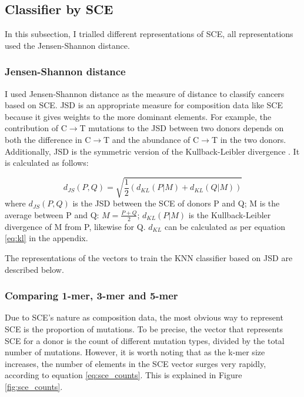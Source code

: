 \newpage
\subsection{Classifier by SCE}
In this subsection, I trialled different representations of SCE, all representations used the Jensen-Shannon distance. 

\subsubsection{Jensen-Shannon distance}
I used Jensen-Shannon distance \citep[JSD;][]{Osterreicher2003} as the measure of distance to classify cancers based on SCE. JSD is an appropriate measure for composition data like SCE because it gives weights to the more dominant elements. For example, the contribution of C$\rightarrow$T mutations to the JSD between two donors depends on both the difference in  C$\rightarrow$T and the abundance of C$\rightarrow$T in the two donors. Additionally, JSD is the symmetric version of the Kullback-Leibler divergence \citep{Kullback1951}. It is calculated as follows:

\begin{equation}
    d_{JS}(P,Q) = \sqrt{\frac{1}{2} (d_{KL}(P|M) + d_{KL}(Q|M))}
\end{equation}
where $d_{JS}(P,Q)$ is the JSD between the SCE of donors P and Q; M is the average between P and Q: $M = \frac{P+Q}{2}$; $d_{KL}(P|M)$ is the Kullback-Leibler divergence of M from P, likewise for Q. $d_{KL}$ can be calculated as per equation \ref{eq:kl} in the appendix.

The representations of the vectors to train the KNN classifier based on JSD are described below.

\subsubsection{Comparing 1-mer, 3-mer and 5-mer}
Due to SCE's nature as composition data, the most obvious way to represent SCE is the proportion of mutations. To be precise, the vector that represents SCE for a donor is the count of different mutation types, divided by the total number of mutations. However, it is worth noting that as the k-mer size increases, the number of elements in the SCE vector surges very rapidly, according to equation \ref{eq:sce_counts}. This is explained in Figure \ref{fig:sce_counts}.




